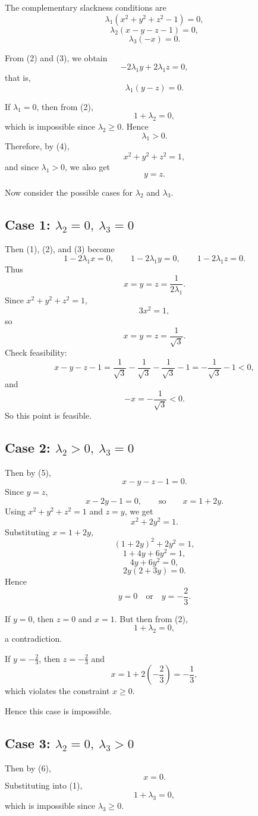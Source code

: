The complementary slackness conditions are
\[
\lambda_1(x^2+y^2+z^2-1)=0, \tag{4}
\]
\[
\lambda_2(x-y-z-1)=0, \tag{5}
\]
\[
\lambda_3(-x)=0. \tag{6}
\]

From (2) and (3), we obtain
\[
-2\lambda_1 y+2\lambda_1 z=0,
\]
that is,
\[
\lambda_1(y-z)=0.
\]

If \(\lambda_1=0\), then from (2),
\[
1+\lambda_2=0,
\]
which is impossible since \(\lambda_2\ge 0\). Hence
\[
\lambda_1>0.
\]
Therefore, by (4),
\[
x^2+y^2+z^2=1,
\]
and since \(\lambda_1>0\), we also get
\[
y=z.
\]

Now consider the possible cases for \(\lambda_2\) and \(\lambda_3\).

\subsection*{Case 1: \(\lambda_2=0,\ \lambda_3=0\)}

Then (1), (2), and (3) become
\[
1-2\lambda_1 x=0,\qquad
1-2\lambda_1 y=0,\qquad
1-2\lambda_1 z=0.
\]
Thus
\[
x=y=z=\frac{1}{2\lambda_1}.
\]
Since \(x^2+y^2+z^2=1\),
\[
3x^2=1,
\]
so
\[
x=y=z=\frac{1}{\sqrt{3}}.
\]
Check feasibility:
\[
x-y-z-1
=
\frac1{\sqrt3}-\frac1{\sqrt3}-\frac1{\sqrt3}-1
=
-\frac1{\sqrt3}-1<0,
\]
and
\[
-x=-\frac1{\sqrt3}<0.
\]
So this point is feasible.

\subsection*{Case 2: \(\lambda_2>0,\ \lambda_3=0\)}

Then by (5),
\[
x-y-z-1=0.
\]
Since \(y=z\),
\[
x-2y-1=0,
\qquad\text{so}\qquad
x=1+2y.
\]
Using \(x^2+y^2+z^2=1\) and \(z=y\), we get
\[
x^2+2y^2=1.
\]
Substituting \(x=1+2y\),
\[
(1+2y)^2+2y^2=1,
\]
\[
1+4y+6y^2=1,
\]
\[
4y+6y^2=0,
\]
\[
2y(2+3y)=0.
\]
Hence
\[
y=0 \quad\text{or}\quad y=-\frac23.
\]

If \(y=0\), then \(z=0\) and \(x=1\). But then from (2),
\[
1+\lambda_2=0,
\]
a contradiction.

If \(y=-\frac23\), then \(z=-\frac23\) and
\[
x=1+2\left(-\frac23\right)=-\frac13,
\]
which violates the constraint \(x\ge 0\).

Hence this case is impossible.

\subsection*{Case 3: \(\lambda_2=0,\ \lambda_3>0\)}

Then by (6),
\[
x=0.
\]
Substituting into (1),
\[
1+\lambda_3=0,
\]
which is impossible since \(\lambda_3\ge 0\).

